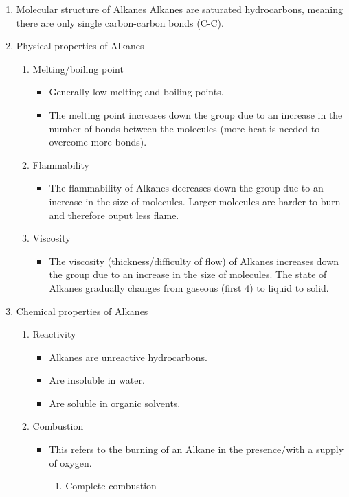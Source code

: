 \documentclass[11pt]{article}
\begin{document}
\begin{enumerate}
\item Molecular structure of Alkanes
\label{sec:orgd6c1999}
Alkanes are saturated hydrocarbons, meaning there are only single carbon-carbon bonds (C-C).
\item Physical properties of Alkanes
\label{sec:org6304c08}
\begin{enumerate}
\item Melting/boiling point
\begin{itemize}
\item Generally low melting and boiling points.
\item The melting point increases down the group due to an increase in the number of bonds between the molecules (more heat is needed to overcome more bonds).
\end{itemize}
\item Flammability
\begin{itemize}
\item The flammability of Alkanes decreases down the group due to an increase in the size of molecules. Larger molecules are harder to burn and therefore ouput less flame.
\end{itemize}
\item Viscosity
\begin{itemize}
\item The viscosity (thickness/difficulty of flow) of Alkanes increases down the group due to an increase in the size of molecules. The state of Alkanes gradually changes from gaseous (first 4) to liquid to solid.
\end{itemize}
\end{enumerate}
\item Chemical properties of Alkanes
\label{sec:org34d8e3d}
\begin{enumerate}
\item Reactivity
\begin{itemize}
\item Alkanes are unreactive hydrocarbons.
\item Are insoluble in water.
\item Are soluble in organic solvents.
\end{itemize}
\item Combustion
\begin{itemize}
\item This refers to the burning of an Alkane in the presence/with a supply of oxygen.
\begin{enumerate}
\item Complete combustion

\end{enumerate}
\end{itemize}
\end{enumerate}
\end{enumerate}
\end{document}
